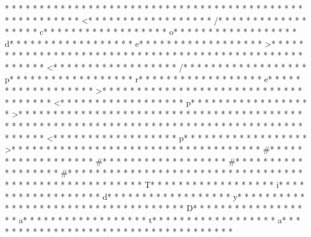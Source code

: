 * * *  * * *  * * *  *  * * *  *  * * *  * 	* * *  * * *  * * *  *  * * *  *  * * *  * 	* * *  * * *  * * *  *  * * *  *  * * *  * <* * *  * * *  * * *  *  * * *  *  * * *  * /* * *  * * *  * * *  *  * * *  *  * * *  * c* * *  * * *  * * *  *  * * *  *  * * *  * o* * *  * * *  * * *  *  * * *  *  * * *  * d* * *  * * *  * * *  *  * * *  *  * * *  * e* * *  * * *  * * *  *  * * *  *  * * *  * >* * *  * * *  * * *  *  * * *  *  * * *  * 
* * *  * * *  * * *  *  * * *  *  * * *  * 	* * *  * * *  * * *  *  * * *  *  * * *  * <* * *  * * *  * * *  *  * * *  *  * * *  * /* * *  * * *  * * *  *  * * *  *  * * *  * p* * *  * * *  * * *  *  * * *  *  * * *  * r* * *  * * *  * * *  *  * * *  *  * * *  * e* * *  * * *  * * *  *  * * *  *  * * *  * >* * *  * * *  * * *  *  * * *  *  * * *  * 
* * *  * * *  * * *  *  * * *  *  * * *  * <* * *  * * *  * * *  *  * * *  *  * * *  * p* * *  * * *  * * *  *  * * *  *  * * *  * >* * *  * * *  * * *  *  * * *  *  * * *  * 
* * *  * * *  * * *  *  * * *  *  * * *  * 	* * *  * * *  * * *  *  * * *  *  * * *  * 
* * *  * * *  * * *  *  * * *  *  * * *  * 	* * *  * * *  * * *  *  * * *  *  * * *  * <* * *  * * *  * * *  *  * * *  *  * * *  * p* * *  * * *  * * *  *  * * *  *  * * *  * >* * *  * * *  * * *  *  * * *  *  * * *  * 
* * *  * * *  * * *  *  * * *  *  * * *  * #* * *  * * *  * * *  *  * * *  *  * * *  * #* * *  * * *  * * *  *  * * *  *  * * *  * #* * *  * * *  * * *  *  * * *  *  * * *  * #* * *  * * *  * * *  *  * * *  *  * * *  *  * * *  * * *  * * *  *  * * *  *  * * *  * {* * *  * * *  * * *  *  * * *  *  * * *  * T* * *  * * *  * * *  *  * * *  *  * * *  * i* * *  * * *  * * *  *  * * *  *  * * *  * d* * *  * * *  * * *  *  * * *  *  * * *  * y* * *  * * *  * * *  *  * * *  *  * * *  *  * * *  * * *  * * *  *  * * *  *  * * *  * D* * *  * * *  * * *  *  * * *  *  * * *  * a* * *  * * *  * * *  *  * * *  *  * * *  * t* * *  * * *  * * *  *  * * *  *  * * *  * a* * *  * * *  * * *  *  * * *  *  * * *  * }* * *  * * *  * * *  *  * * *  *  * * *  * 
